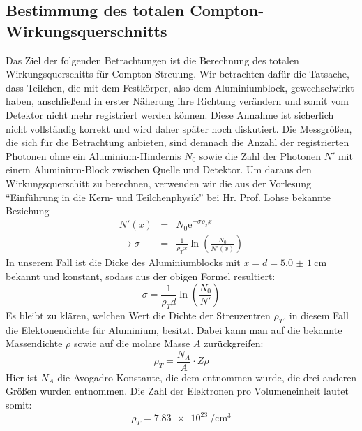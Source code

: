 \subsection{Bestimmung des totalen Compton-Wirkungsquerschnitts}
Das Ziel der folgenden Betrachtungen ist die Berechnung des totalen
Wirkungsquerschitts für Compton-Streuung. Wir betrachten dafür die Tatsache,
dass Teilchen, die mit dem Festkörper, also dem Aluminiumblock, gewechselwirkt
haben, anschließend in erster Näherung ihre Richtung verändern und somit vom
Detektor nicht mehr registriert werden können. Diese Annahme ist sicherlich
nicht vollständig korrekt und wird daher später noch diskutiert. Die
Messgrößen, die sich für die Betrachtung anbieten, sind demnach die Anzahl der
registrierten Photonen ohne ein Aluminium-Hindernis $N_0$ sowie die Zahl der
Photonen $N'$ mit einem Aluminium-Block zwischen Quelle und Detektor. Um daraus
den Wirkungsquerschitt zu berechnen, verwenden wir die aus der Vorlesung
``Einführung in die Kern- und Teilchenphysik'' bei Hr. Prof. Lohse bekannte
Beziehung
\begin{eqnarray}
  N'(x) &=& N_0 \mathrm e^{-\sigma \rho_T x}\\
\rightarrow \sigma &=& \frac{1}{\rho_T x}\ln\left(\frac{N_0}{N'(x)}\right)
\end{eqnarray}
In unserem Fall ist die Dicke des Aluminiumblocks mit $x = d =
\SI{5,0(1)}{\centi\meter}$ bekannt und konstant, sodass aus der obigen Formel
resultiert:
\begin{equation}
  \sigma = \frac{1}{\rho_T d}\ln\left(\frac{N_0}{N'}\right)
\end{equation}
Es bleibt zu klären, welchen Wert die Dichte der Streuzentren $\rho_T$, in
diesem Fall die Elektonendichte für Aluminium, besitzt. Dabei kann man
auf die bekannte Massendichte $\rho$ sowie auf die molare Masse $A$
zurückgreifen:
\begin{equation}
  \rho_T = \frac{N_A}{A}\cdot Z\rho
\end{equation}
Hier ist $N_A$ die Avogadro-Konstante, die dem \cite{pdb} entnommen wurde, die
drei anderen Größen wurden \cite[Tab.2]{script} entnommen. Die Zahl der
Elektronen pro Volumeneinheit lautet somit:
\begin{equation}
  \rho_T = \SI{7,83e23}{\per\centi\meter\cubed}
\end{equation}

